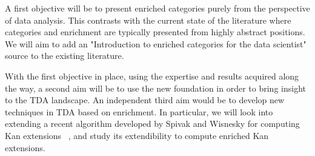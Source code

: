 A first objective will be to present enriched categories purely from the perspective of data analysis. This contrasts with the current state of the literature where categories and enrichment are typically presented from highly abstract positions. We will aim to add an "Introduction to enriched categories for the data scientist" source to the existing literature. 

With the first objective in place, using the expertise and results acquired along the way, a second aim will be to use the new foundation in order to bring insight to the TDA landscape. An independent third aim would be to develop new techniques in TDA based on enrichment. In particular, we will look into extending a recent algorithm developed by Spivak and Wisnesky for computing Kan extensions ~\cite{spivak}, and study its extendibility to compute enriched Kan extensions. 

